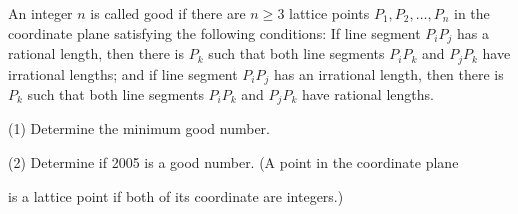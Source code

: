 An integer $ n$ is called good if there are $ n \geq 3$ lattice points $ P_1, P_2, \ldots, P_n$ in the coordinate plane satisfying the following conditions: If line segment $ P_iP_j$ has a rational length, then there is $ P_k$ such that both line segments $ P_iP_k$ and $ P_jP_k$ have irrational lengths; and if line segment $ P_iP_j$ has an irrational length, then there is $ P_k$ such that both line segments $ P_iP_k$ and $ P_jP_k$ have rational lengths.

(1) Determine the minimum good number.

(2) Determine if 2005 is a good number. (A point in the coordinate plane

 is a lattice point if both of its coordinate are integers.)